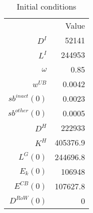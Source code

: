 \begin{table}
\centering
\begin{tabular}{rr}
 & Value \\
$D^{I}$ & 52141 \\
$L^{I}$ & 244953 \\
$\omega$ & 0.85 \\
$w^{UB}$ & 0.0042 \\
$sb^{inact}(0)$ & 0.0023 \\
$sb^{other}(0)$ & 0.0005 \\
$D^{H}$ & 222933 \\
$K^{H}$ & 405376.9 \\
$L^{G}(0)$ & 244696.8 \\
$E_{k}(0)$ & 106948 \\
$E^{CB}(0)$ & 107627.8 \\
$D^{RoW}(0)$ & 0 \\
\end{tabular}
\caption{Initial conditions}
\label{table:initial_conditions}
\end{table}
